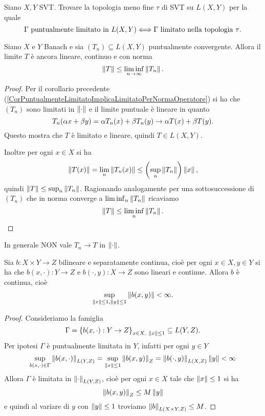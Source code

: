 \begin{exercise}
Siano $X,Y$ SVT. Trovare la topologia meno fine $\tau$ di SVT su $L(X,Y)$ per la quale
\[\Gamma\text{ puntualmente limitato in $L(X,Y)$}\Longleftrightarrow \Gamma\text{ limitato nella topologia $\tau$}.\]
\end{exercise}


\begin{corollary}\label{CorConvergenzaLineariSePuntualmenteConvergente}
Siano $X$ e $Y$ Banach e sia $(T_n)\subseteq L(X,Y)$ puntualmente convergente. Allora il limite $T$ \`e ancora lineare, continuo e con norma
\[\left\Vert{T}\right\Vert\leq \liminf_{n\to\infty}\left\Vert{T_n}\right\Vert.\]
\end{corollary}
\begin{proof}
Per il corollario precedente (\ref{CorPuntualmenteLimitatoImplicaLimitatoPerNormaOperatore}) si ha che $(T_n)$ sono limitati in ${\left\Vert{\cdot}\right\Vert}$ e il limite puntuale \`e lineare in quanto
\[T_n(\alpha x+\beta y)=\alpha T_n(x)+\beta T_n(y)\to \alpha T(x)+\beta T(y).\]
Questo mostra che $T$ \`e limitato e lineare, quindi $T\in L(X,Y)$.

Inoltre per ogni $x\in X$ si ha
\[\left\Vert{T(x)}\right\Vert=\lim_{n}\left\Vert{T_n(x)}\right\Vert\leq \left({\sup_n\left\Vert{T_n}\right\Vert}\right)\left\Vert{x}\right\Vert,\]
quindi $\left\Vert{T}\right\Vert\leq \sup_n\left\Vert{T_n}\right\Vert$. Ragionando analogamente per una sottosuccessione di $(T_n)$ che in norma converge a $\liminf_n\left\Vert{T_n}\right\Vert$ ricaviamo
\[\left\Vert{T}\right\Vert\leq \liminf_n\left\Vert{T_n}\right\Vert.\]
\end{proof}

\begin{remark}
In generale NON vale $T_n\to T$ in ${\left\Vert{\cdot}\right\Vert}$.
\end{remark}

\begin{proposition}\label{PrBilineareSeparatamenteContinuaEContinua}
Sia $b:X\times Y\to Z$ bilineare e separatamente continua, cio\`e per ogni $x\in X, y\in Y$ si ha che $b(x,\cdot):Y\to Z$ e $b(\cdot, y):X\to Z$ sono lineari e continue. Allora $b$ \`e continua, cio\`e
\[\sup_{\left\Vert{x}\right\Vert\leq 1, \left\Vert{y}\right\Vert\leq 1}\left\Vert{b(x,y)}\right\Vert<\infty.\]
\end{proposition}
\begin{proof}
Consideriamo la famiglia
\[\Gamma=\left\{{b(x,\cdot):Y\to Z}\right\}_{x\in X,\ \left\Vert{x}\right\Vert\leq 1}\subseteq L(Y,Z).\]
Per ipotesi $\Gamma$ \`e puntualmente limitata in $Y$, infatti per ogni $y\in Y$
\[\sup_{b(x,\cdot)\in\Gamma} \left\Vert{b(x,\cdot)}\right\Vert_{L(Y,Z)}=\sup_{\left\Vert{x}\right\Vert\leq 1}\left\Vert{b(x,y)}\right\Vert_Z= \left\Vert{b(\cdot,y)}\right\Vert_{L(X,Z)}\left\Vert{y}\right\Vert<\infty\]
Allora $\Gamma$ \`e limitata in ${\left\Vert{\cdot}\right\Vert}_{L(Y,Z)}$, cio\`e per ogni $x\in X$ tale che $\left\Vert{x}\right\Vert\leq 1$ si ha
\[\left\Vert{b(x,y)}\right\Vert_Z\leq M\left\Vert{y}\right\Vert\]
e quindi al variare di $y$ con $\left\Vert{y}\right\Vert\leq 1$ troviamo $\left\Vert{b}\right\Vert_{L(X\times Y,Z)}\leq M$.
\end{proof}

